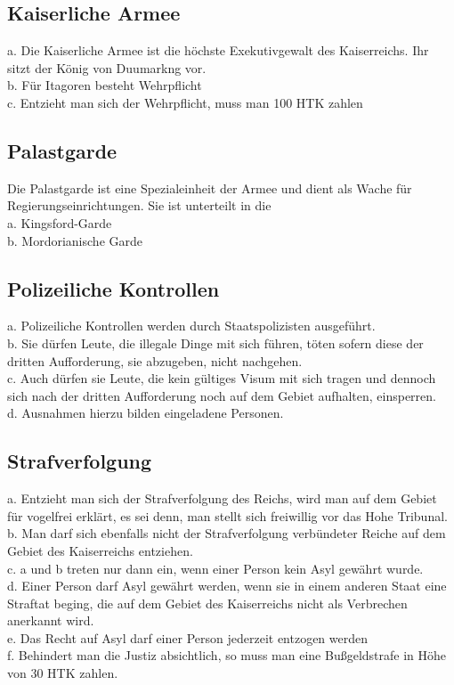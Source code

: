 \documentclass{article}
\begin{document}
\subsection{Kaiserliche Armee}
a. Die Kaiserliche Armee ist die höchste Exekutivgewalt des Kaiserreichs. Ihr sitzt der König von Duumarkng vor.\\
b. Für Itagoren besteht Wehrpflicht\\
c. Entzieht man sich der Wehrpflicht, muss man 100 HTK zahlen

\subsection{Palastgarde}
Die Palastgarde ist eine Spezialeinheit der Armee und dient als Wache für Regierungseinrichtungen. Sie ist unterteilt in die\\
a. Kingsford-Garde\\
b. Mordorianische Garde

\subsection{Polizeiliche Kontrollen}
a. Polizeiliche Kontrollen werden durch Staatspolizisten ausgeführt.\\
b. Sie dürfen Leute, die illegale Dinge mit sich führen, töten sofern diese der dritten Aufforderung, sie abzugeben, nicht nachgehen.\\
c. Auch dürfen sie Leute, die kein gültiges Visum mit sich tragen und dennoch sich nach der dritten Aufforderung noch auf dem Gebiet aufhalten, einsperren.\\
d. Ausnahmen hierzu bilden eingeladene Personen.

\subsection{Strafverfolgung}
a. Entzieht man sich der Strafverfolgung des Reichs, wird man auf dem Gebiet für vogelfrei erklärt, es sei denn, man stellt sich freiwillig vor das Hohe Tribunal.\\
b. Man darf sich ebenfalls nicht der Strafverfolgung verbündeter Reiche auf dem Gebiet des Kaiserreichs entziehen.\\
c. a und b treten nur dann ein, wenn einer Person kein Asyl gewährt wurde.\\
d. Einer Person darf Asyl gewährt werden, wenn sie in einem anderen Staat eine Straftat beging, die auf dem Gebiet des Kaiserreichs nicht als Verbrechen anerkannt wird.\\
e. Das Recht auf Asyl darf einer Person jederzeit entzogen werden\\
f. Behindert man die Justiz absichtlich, so muss man eine Bußgeldstrafe in Höhe von 30 HTK zahlen. 
\end{document}

